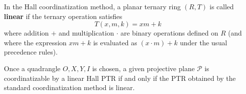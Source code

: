 In the Hall coordinatization method, a planar ternary ring $(R, T)$ is called \textbf{linear} if the ternary operation satisfies
$$T(x, m, k) = xm + k$$
where addition $+$ and multiplication $\cdot$ are binary operations defined on $R$ (and where the expression $xm + k$ is evaluated as $(x \cdot m) + k$ under the usual precedence rules).

Once a quadrangle $O, X, Y, I$ is chosen, a given projective plane $\mathcal{P}$ is coordinatizable by a linear Hall PTR if and only if the PTR obtained by the standard coordinatization method is linear.
